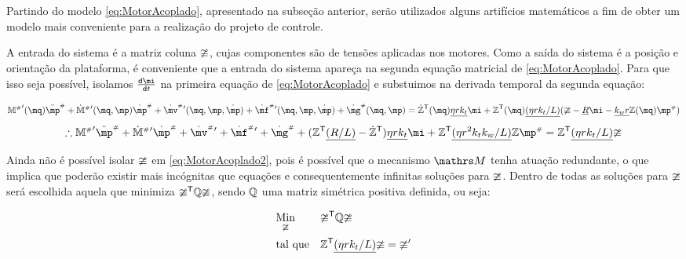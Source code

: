 \documentclass[a4paper,11pt,brazil,fleqn]{article}
\begin{document}
Partindo do modelo \eqref{eq:MotorAcoplado}, apresentado na subse\c{c}\~ao anterior, ser\~ao utilizados alguns artif\'icios matem\'aticos a fim de obter um modelo mais conveniente para a realiza\c{c}\~ao do projeto de controle.

A entrada do sistema \'e a matriz coluna $\mathbb{\upsilon}$, cujas componentes s\~ao de tens\~oes aplicadas nos motores. Como a sa\'ida do sistema \'e a posi\c{c}\~ao e orienta\c{c}\~ao da plataforma, \'e conveniente que a entrada do sistema apare\c{c}a na segunda equa\c{c}\~ao matricial de \eqref{eq:MotorAcoplado}. Para que isso seja poss\'ivel, isolamos $\frac{\dd \mi}{\dd t}$ na primeira equa\c{c}\~ao de \eqref{eq:MotorAcoplado} e substuimos na derivada temporal da segunda equa\c{c}\~ao:

\begin{equation}
{\mM\ssh}'(\mq) \ddot{\mp}\ssh + {{\dot{\mM}}\ssh}{'} (\mq,\mp) \dot{\mp}\ssh + {\dot{\mv}\ssh}{'}(\mq,\mp,\dot{\mp}) + {\dot{\mf}\ssh}{'}(\mq,\mp,\dot{\mp}) + {\dot{\mg}\ssh}(\mq,\mp) = \dot{\mZ}^\msT (\mq) \underline{\eta r k_t} \mi + \mZ^\msT (\mq) \underline{(\eta r k_t / L)} ( \mup -  \underline{R} \mi - \underline{k_w r} \mZ (\mq) \mp\ssh )
\end{equation}
\begin{equation} \label{eq:MotorAcoplado2}
\therefore {\mM\ssh}' \ddot{\mp}\ssh + {{\dot{\mM}}\ssh}{'} \dot{\mp}\ssh + {\dot{\mv}\ssh}{'} + {\dot{\mf}\ssh}{'} + {\dot{\mg}\ssh} + ( \mZ^\msT  \underline{(R/L)} - \dot{\mZ}^\msT ) \underline{\eta r k_t} \mi + \mZ^\msT  \underline{(\eta r^2 k_t k_w / L)}  \mZ \mp\ssh =  \mZ^\msT  \underline{(\eta r k_t / L)} \mup
\end{equation}

Ainda n\~ao \'e poss\'ivel isolar $\mathbb{\upsilon}$ em \eqref{eq:MotorAcoplado2}, pois \'e poss\'ivel que o mecanismo $\ssM$ tenha atua\c{c}\~ao redundante, o que implica que poder\~ao existir mais inc\'ognitas que equa\c{c}\~oes e consequentemente infinitas solu\c{c}\~oes para $\mathbb{\upsilon}$. Dentro de todas as solu\c{c}\~oes para $\mathbb{\upsilon}$ ser\'a escolhida aquela que minimiza $\mathbb{\upsilon}^{\mathsf{T}} \mathbb{Q} \mathbb{\upsilon}$, sendo $\mathbb{Q}$ uma matriz sim\'etrica positiva definida, ou seja:

\begin{equation} \label{eq:Optimization_}
\begin{aligned}
& \underset{\mathbb{\upsilon}}{\text{Min}}
& & \mathbb{\upsilon}^{\mathsf{T}} \mathbb{Q} \mathbb{\upsilon} \\
& \text{tal que}
& & \mathbb{Z}^{\mathsf{T}}  \underline{(\eta r k_t / L)} \mathbb{\upsilon} = \mathbb{\upsilon}'
\end{aligned}
\end{equation}
\end{document}
